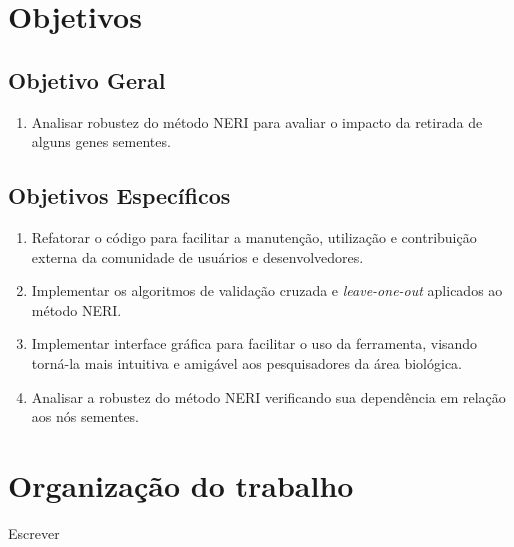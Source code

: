 






\section{Objetivos}
\subsection{Objetivo Geral}
\begin{center}
  \begin{enumerate}
  \item {Analisar robustez do método NERI para avaliar o impacto da retirada de alguns genes sementes.}

  \end{enumerate}
\end{center}

\subsection{Objetivos Específicos}
\begin{center}
  \begin{enumerate}
  \item {Refatorar o código para facilitar a manutenção, utilização e contribuição externa da comunidade de usuários e desenvolvedores.}
    \item {Implementar os algoritmos de validação cruzada e \textit{leave-one-out} aplicados ao método NERI.}
    \item{Implementar interface gráfica para facilitar o uso da ferramenta, visando torná-la mais intuitiva e amigável aos pesquisadores da área biológica.}
    \item {Analisar a robustez do método NERI verificando sua dependência em relação aos nós sementes.}
  \end{enumerate}
\end{center}


\section{Organização do trabalho}
Escrever

